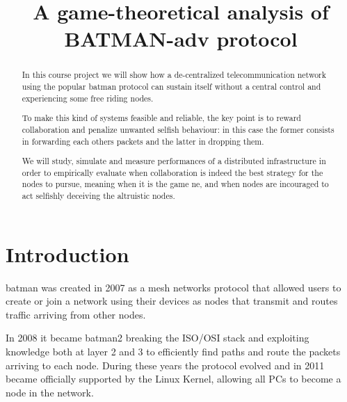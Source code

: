 \documentclass[conference,10.5pt]{IEEEtran}
\begin{document}
\title{A game-theoretical analysis of BATMAN-adv protocol}

\author{
\and
{}
}

\maketitle

\begin{abstract}
  In this course project we will show how a de-centralized telecommunication network using the popular \gls{batman} protocol can sustain itself without a central control and experiencing some free riding nodes.

  To make this kind of systems feasible and reliable, the key point is to reward collaboration and penalize unwanted selfish behaviour: in this case the former consists in forwarding each others packets and the latter in dropping them.

  We will study, simulate and measure performances of a distributed infrastructure in order to empirically evaluate when collaboration is indeed the best strategy for the nodes to pursue, meaning when it is the game \gls{ne}, and when nodes are incouraged to act selfishly deceiving the altruistic nodes.
\end{abstract}

\section{Introduction}


\gls{batman} was created in 2007 as a mesh networks protocol that allowed users to create or join a network using their devices as nodes that transmit and routes traffic arriving from other nodes.

In 2008 it became \gls{batman2} breaking the ISO/OSI stack and exploiting knowledge both at layer 2 and 3 to efficiently find paths and route the packets arriving to each node. During these years the protocol evolved and in 2011 became officially supported by the Linux Kernel, allowing all PCs to become a node in the network.
\end{document}
